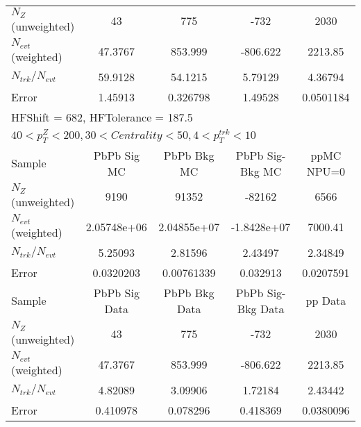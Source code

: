 \begin{table}[h!]
\begin{tabular}{|l|c|c|c|c|}
$N_Z$ (unweighted)& 43             & 775            & -732           & 2030           \\
$N_{evt}$ (weighted)& 47.3767        & 853.999        & -806.622       & 2213.85        \\
$N_{trk}/N_{evt}$& 59.9128        & 54.1215        & 5.79129        & 4.36794        \\
Error          & 1.45913        & 0.326798       & 1.49528        & 0.0501184      \\
\hline\hline
\multicolumn{5}{l}{ HFShift = 682, HFTolerance = 187.5}\\
\multicolumn{5}{l}{ $40 < p_{T}^{Z} < 200, 30 < Centrality < 50, 4 < p_{T}^{trk} < 10$}\\
\hline\hline
Sample         & PbPb Sig MC    & PbPb Bkg MC    & PbPb Sig-Bkg MC& ppMC NPU=0     \\
$N_Z$ (unweighted)& 9190           & 91352          & -82162         & 6566           \\
$N_{evt}$ (weighted)& 2.05748e+06    & 2.04855e+07    & -1.8428e+07    & 7000.41        \\
$N_{trk}/N_{evt}$& 5.25093        & 2.81596        & 2.43497        & 2.34849        \\
Error          & 0.0320203      & 0.00761339     & 0.032913       & 0.0207591      \\
\hline
Sample         & PbPb Sig Data  & PbPb Bkg Data  & PbPb Sig-Bkg Data& pp Data  \\
$N_Z$ (unweighted)& 43             & 775            & -732           & 2030           \\
$N_{evt}$ (weighted)& 47.3767        & 853.999        & -806.622       & 2213.85        \\
$N_{trk}/N_{evt}$& 4.82089        & 3.09906        & 1.72184        & 2.43442        \\
Error          & 0.410978       & 0.078296       & 0.418369       & 0.0380096      \\
\hline\hline
\end{tabular}
\end{table}
\clearpage
